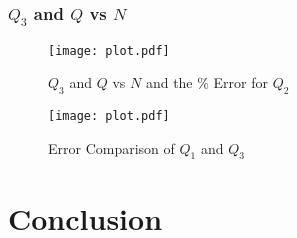 \documentclass[12pt]{article}
\begin{document}
			\subsubsection{$Q_{3}$ and $Q$ vs $N$}
				
				
				
				\begin{figure}[H]
					\centering
					\texttt{[image: plot.pdf]}
					\caption{\Large $Q_{3}$ and $Q$ vs $N$ and the \% Error for $Q_{2}$}
					\label{fig:q2sumerrorplot}
				\end{figure}
				
				\begin{figure}[H]
					\centering
					\texttt{[image: plot.pdf]}
					\caption{\Large Error Comparison of $Q_{1}$ and $Q_{3}$}
					\label{fig:q1q3errorplot}
				\end{figure}
				
				 
	\section{Conclusion}
	
\end{document}
